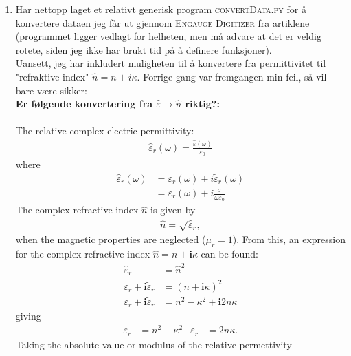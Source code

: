 \begin{enumerate}[label=\textbf{\arabic*})]
   \item Har nettopp laget et relativt generisk program \textsc{convertData.py} for å konvertere dataen 
      jeg får ut gjennom \textsc{Engauge Digitizer} fra artiklene (programmet ligger vedlagt for helheten,
      men må advare at det er veldig rotete, siden jeg ikke har brukt tid på å definere funksjoner).\\
      Uansett, jeg har inkludert muligheten til å konvertere fra permittivitet til "refraktive index"
      $\hat{n} = n + i\kappa$. Forrige gang var fremgangen min feil, så vil bare være sikker: \\
      \textbf{Er følgende konvertering fra $\hat{\varepsilon} \rightarrow \hat{n}$ riktig?:} \\
      \\
      The relative complex electric permittivity:
      \begin{align}
         \hat{\varepsilon}_r(\omega) = \frac{\hat{\varepsilon} (\omega)}{\varepsilon_0}
      \end{align}
      where 
      \begin{align}
         \hat{\varepsilon}_r(\omega) &= \varepsilon_r (\omega) + i\tilde{\varepsilon}_r (\omega) \\
                                     &= \varepsilon_r (\omega) + i\frac{\sigma}{\omega\varepsilon_0} 
      \end{align}
      The complex refractive index $\hat{n}$ is given by 
      \begin{align}
         \hat{n} = \sqrt{\hat{\varepsilon}_r},
      \end{align}
      when the magnetic properties are neglected ($\mu_r = 1$). 
      From this, an expression for the complex refractive index $\hat{n} = n + \boldsymbol{i}\kappa$ can be found:
      \begin{align}
         \hat{\varepsilon}_r &= \hat{n}^2 \\
         \varepsilon_r + \boldsymbol{i}\tilde{\varepsilon}_r &= (n + \boldsymbol{i} \kappa)^2 \\
         \varepsilon_r + \boldsymbol{i}\tilde{\varepsilon}_r &= n^2 - \kappa^2 + \boldsymbol{i}2n\kappa
      \end{align}
      giving
      \begin{align}
         \varepsilon_r &= n^2 - \kappa^2     &\tilde{\varepsilon}_r  &= 2n\kappa.
      \end{align}
      Taking the absolute value or modulus of the relative permettivity
      \begin{align}

\end{align}
\end{enumerate}
